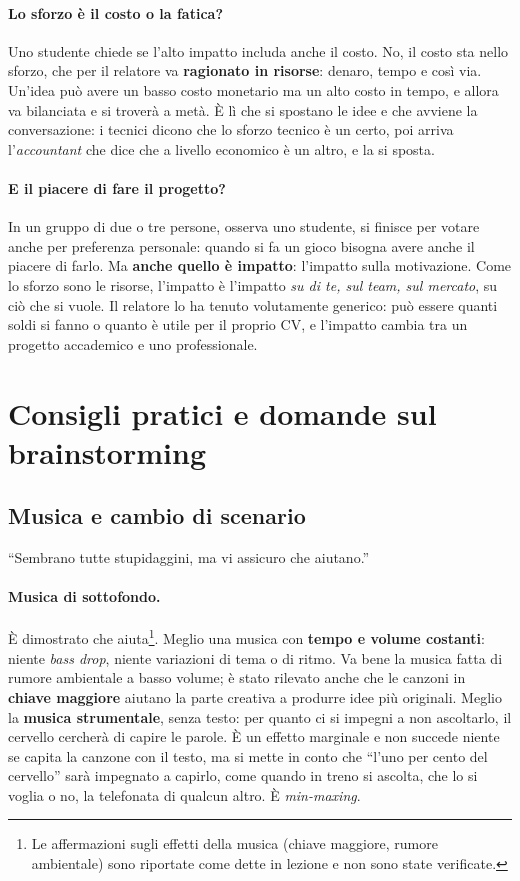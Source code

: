 \paragraph{Lo sforzo è il costo o la fatica?} Uno studente chiede se l'alto impatto
includa anche il costo. No, il costo sta nello sforzo, che per il relatore va
\textbf{ragionato in risorse}: denaro, tempo e così via. Un'idea può avere un basso costo
monetario ma un alto costo in tempo, e allora va bilanciata e si troverà a metà. È lì che
si spostano le idee e che avviene la conversazione: i tecnici dicono che lo sforzo tecnico
è un certo, poi arriva l'\emph{accountant} che dice che a livello economico è un altro, e
la si sposta.

\paragraph{E il piacere di fare il progetto?} In un gruppo di due o tre persone, osserva
uno studente, si finisce per votare anche per preferenza personale: quando si fa un gioco
bisogna avere anche il piacere di farlo. Ma \textbf{anche quello è impatto}: l'impatto
sulla motivazione. Come lo sforzo sono le risorse, l'impatto è l'impatto \emph{su di te,
sul team, sul mercato}, su ciò che si vuole. Il relatore lo ha tenuto volutamente
generico: può essere quanti soldi si fanno o quanto è utile per il proprio CV, e
l'impatto cambia tra un progetto accademico e uno professionale.

\section{Consigli pratici e domande sul brainstorming}
\label{sec:z2-qa-brainstorming}

\subsection{Musica e cambio di scenario}

``Sembrano tutte stupidaggini, ma vi assicuro che aiutano.''

\paragraph{Musica di sottofondo.} È dimostrato che aiuta\footnote{Le affermazioni sugli
effetti della musica (chiave maggiore, rumore ambientale) sono riportate come dette in
lezione e non sono state verificate.}. Meglio una musica con \textbf{tempo e volume
costanti}: niente \emph{bass drop}, niente variazioni di tema o di ritmo. Va bene la
musica fatta di rumore ambientale a basso volume; è stato rilevato anche che le canzoni
in \textbf{chiave maggiore} aiutano la parte creativa a produrre idee più originali.
Meglio la \textbf{musica strumentale}, senza testo: per quanto ci si impegni a non
ascoltarlo, il cervello cercherà di capire le parole. È un effetto marginale e non
succede niente se capita la canzone con il testo, ma si mette in conto che ``l'uno per
cento del cervello'' sarà impegnato a capirlo, come quando in treno si ascolta, che lo si
voglia o no, la telefonata di qualcun altro. È \emph{min-maxing}.

